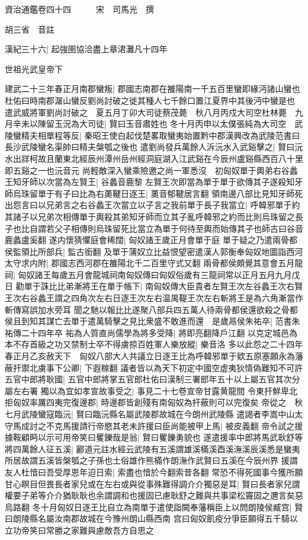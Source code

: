 資治通鑑卷四十四　　　宋　司馬光　撰

胡三省　音註

漢紀三十六|{
	起強圉協洽盡上章涒灘凡十四年}


世祖光武皇帝下

建武二十三年春正月南郡蠻叛|{
	郡國志南郡在雒陽南一千五百里蠻即緣沔諸山蠻也杜佑曰時南郡潳山蠻反劉尚討破之徙其種人七千餘口置江夏界中其後沔中蠻是也}
遣武威將軍劉尚討破之　夏五月丁卯大司徒蔡茂薨　秋八月丙戍大司空杜林薨　九月辛未以陳留玉況為大司徒|{
	賢曰玉音肅姓也}
冬十月丙申以太僕張純為大司空　武陵蠻精夫相單程等反|{
	秦昭王使白起伐楚畧取蠻夷始置黔中郡漢興改為武陵范書曰長沙武陵蠻名渠帥曰精夫槃瓠之後也}
遣劉尚發兵萬餘人泝沅水入武谿擊之|{
	賢曰沅水出牂柯故且蘭東北經辰州潭州岳州經洞庭湖入江武谿在今辰州盧谿縣西百八十里即五谿之一也沅音元}
尚輕敵深入蠻乘險邀之尚一軍悉沒　初匈奴單于輿弟右谷蠡王知牙師以次當為左賢王|{
	谷蠡音鹿黎}
左賢王次即當為單于單于欲傳其子遂殺知牙師烏珠留單于有子曰比為右薁鞬日逐王|{
	薁音郁鞬居言翻}
領南邊八部比見知牙師死出怨言曰以兄弟言之右谷蠡王次當立以子言之我前單于長子我當立|{
	呼韓邪單于約其諸子以兄弟次相傳單于輿殺其弟知牙師而立其子亂呼韓邪之約而比則烏珠留之長子也比自謂若父子相傳則烏珠留死比當立為單于何待至輿而始傳其子也師古曰谷音鹿蠡盧奚翻}
遂内懷猜懼庭會稀闊|{
	匈奴諸王歲正月會單于庭}
單于疑之乃遣兩骨都侯監領比所部兵|{
	監古銜翻}
及單于蒲奴立比益恨望密遣漢人郭衡奉匈奴地圖詣西河太守求内附|{
	郡國志西河郡在雒陽北千二百里守式又翻}
兩骨都侯頗覺其意會五月龍祠|{
	匈奴諸王每歲五月會龍城祠南匈奴傳曰匈奴俗歲有三龍祠常以正月五月九月戊日}
勸單于誅比比弟漸將王在單于帳下|{
	南匈奴傳大臣貴者左賢王次左谷蠡王次右賢王次右谷蠡王謂之四角次左右日逐王次左右温禺鞮王次左右斬將王是為六角漸當作斬傳寫誤加水旁耳}
聞之馳以報比比遂聚八部兵四五萬人待兩骨都侯還欲殺之骨都侯且到知其謀亡去單于遣萬騎擊之見比衆盛不敢進而還　是歲鬲侯朱祐卒|{
	范書朱祐傳二十四年卒}
祐為人質直尚儒學為將多受降|{
	將即亮翻降戶江翻}
以克定城邑為本不存首級之功又禁制士卒不得虜掠百姓軍人樂放縱|{
	樂音洛}
多以此怨之二十四年春正月乙亥赦天下　匈奴八部大人共議立日逐王比為呼韓邪單于欵五原塞願永為藩蔽扞禦北虜事下公卿|{
	下遐稼翻}
議者皆以為天下初定中國空虚夷狄情偽難知不可許五官中郎將耿國|{
	五官中郎將掌五官郎杜佑曰漢制三署郎年五十以上屬五官其次分屬左右署}
獨以為宜如孝宣故事受之|{
	事見二十七卷宣帝甘露黄龍間}
令東扞鮮卑北拒匈奴率厲四夷完復邊郡|{
	時邊郡皆創殘有南匈奴為扞蔽則可以完復矣}
帝從之　秋七月武陵蠻寇臨沅|{
	賢曰臨沅縣名屬武陵郡故城在今朗州武陵縣}
遣謁者李嵩中山太守馬成討之不克馬援請行帝愍其老未許援曰臣尚能被甲上馬|{
	被皮義翻}
帝令試之援據鞍顧眄以示可用帝笑曰矍鑠哉是翁|{
	賢曰矍鑠勇貌也}
遂遣援率中郎將馬武耿舒等將四萬餘人征五溪|{
	酈道元註水經云武陵有五溪謂雄溪樠溪酉溪潕溪辰溪悉是蠻夷所居故謂五溪皆槃瓠之子孫也土俗雄作熊樠作朗潕作武賢曰五溪在今辰州界}
援謂友人杜愔曰吾受厚恩年迫日索|{
	索盡也愔於今翻索昔各翻}
常恐不得死國事今獲所願甘心瞑目但畏長者家兒或在左右或與從事殊難得調介介獨惡是耳|{
	賢曰長者家兒謂權要子弟等介介猶耿耿也余謂調和也援固已慮耿舒之難與共事梁松竇固之邇言矣惡烏路翻}
冬十月匈奴日逐王比自立為南單于遣使詣闕奉藩稱臣上以問朗陵侯臧宫|{
	賢曰朗陵縣名屬汝南郡故城在今豫州朗山縣西南}
宫曰匈奴飢疫分爭臣願得五千騎以立功帝笑曰常勝之家難與慮敵吾方自思之

